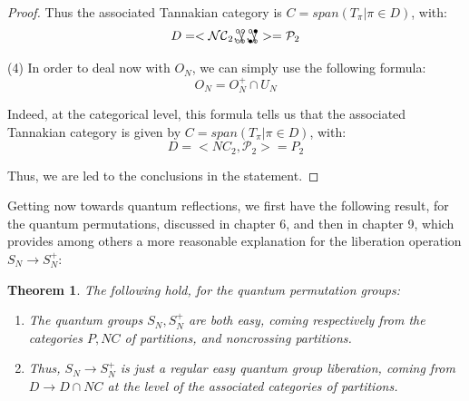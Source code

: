 \documentclass[12pt]{amsbook}
\newtheorem{theorem}{Theorem}[chapter]
\begin{document}
\begin{proof}
Thus the associated Tannakian category is $C=span(T_\pi|\pi\in D)$, with:
$$D
=<\mathcal{NC}_2,{\slash\hskip-2.1mm\backslash}^{\hskip-2.5mm\circ\circ}_{\hskip-2.5mm\circ\circ},{\slash\hskip-2.1mm\backslash}^{\hskip-2.5mm\circ\bullet}_{\hskip-2.5mm\bullet\circ}>
=\mathcal P_2$$

(4) In order to deal now with $O_N$, we can simply use the following formula: 
$$O_N=O_N^+\cap U_N$$

Indeed, at the categorical level, this formula tells us that the associated Tannakian category is given by $C=span(T_\pi|\pi\in D)$, with:
$$D
=<NC_2,\mathcal P_2>
=P_2$$

Thus, we are led to the conclusions in the statement.
\end{proof}

Getting now towards quantum reflections, we first have the following result, for the quantum permutations, discussed in chapter 6, and then in chapter 9, which provides among others a more reasonable explanation for the liberation operation $S_N\to S_N^+$:


\begin{theorem}
The following hold, for the quantum permutation groups:
\begin{enumerate}
\item The quantum groups $S_N,S_N^+$ are both easy, coming respectively from the categories $P,NC$ of partitions, and noncrossing partitions.  

\item Thus, $S_N\to S_N^+$ is just a regular easy quantum group liberation, coming from $D\to D\cap NC$ at the level of the associated categories of partitions.
\end{enumerate}
\end{theorem}
\end{document}

